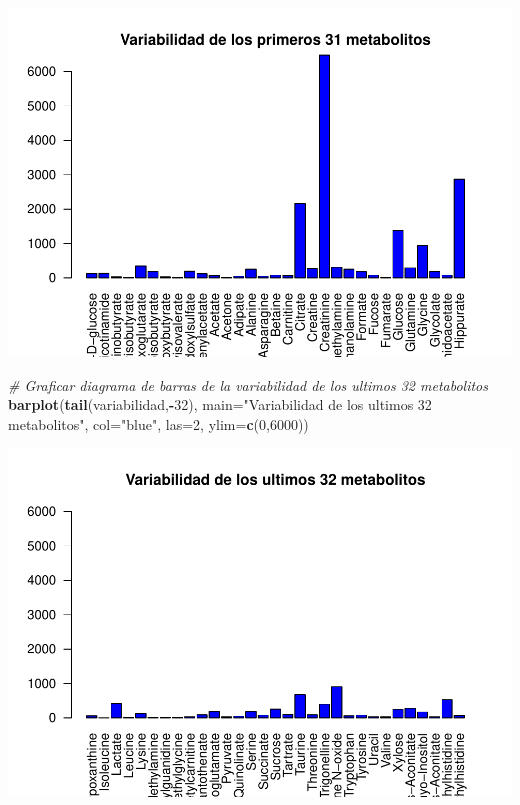 \documentclass[
]{article}
\newenvironment{Shaded}{\begin{snugshade}}{\end{snugshade}}
\newcommand{\AttributeTok}[1]{\textcolor[rgb]{0.13,0.29,0.53}{#1}}
\newcommand{\CommentTok}[1]{\textcolor[rgb]{0.56,0.35,0.01}{\textit{#1}}}
\newcommand{\DecValTok}[1]{\textcolor[rgb]{0.00,0.00,0.81}{#1}}
\newcommand{\FunctionTok}[1]{\textcolor[rgb]{0.13,0.29,0.53}{\textbf{#1}}}
\newcommand{\NormalTok}[1]{#1}
\newcommand{\SpecialCharTok}[1]{\textcolor[rgb]{0.81,0.36,0.00}{\textbf{#1}}}
\newcommand{\StringTok}[1]{\textcolor[rgb]{0.31,0.60,0.02}{#1}}
\begin{document}
\includegraphics{PEC1_files/figure-latex/unnamed-chunk-8-1.pdf}

\begin{Shaded}
\begin{Highlighting}[]
\CommentTok{\# Graficar diagrama de barras de la variabilidad de los ultimos 32 metabolitos}
\FunctionTok{barplot}\NormalTok{(}\FunctionTok{tail}\NormalTok{(variabilidad,}\SpecialCharTok{{-}}\DecValTok{32}\NormalTok{), }\AttributeTok{main=}\StringTok{"Variabilidad de los ultimos 32 metabolitos"}\NormalTok{, }\AttributeTok{col=}\StringTok{"blue"}\NormalTok{, }\AttributeTok{las=}\DecValTok{2}\NormalTok{, }\AttributeTok{ylim=}\FunctionTok{c}\NormalTok{(}\DecValTok{0}\NormalTok{,}\DecValTok{6000}\NormalTok{))}
\end{Highlighting}
\end{Shaded}

\includegraphics{PEC1_files/figure-latex/unnamed-chunk-8-2.pdf}
\end{document}
